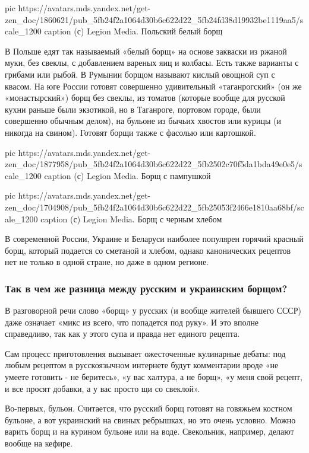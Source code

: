 \ifcmt
pic https://avatars.mds.yandex.net/get-zen_doc/1860621/pub_5fb24f2a1064d30b6c622d22_5fb24fd38d19932be1119aa5/scale_1200
caption (с) Legion Media. Польский белый борщ
\fi

В Польше едят так называемый «белый борщ» на основе закваски из ржаной муки,
без свеклы, с добавлением вареных яиц и колбасы. Есть также варианты с грибами
или рыбой. В Румынии борщом называют кислый овощной суп с квасом. На юге России
готовят совершенно удивительный «таганрогский» (он же «монастырский») борщ без
свеклы, из томатов (которые вообще для русской кухни раньше были экзотикой, но
в Таганроге, портовом городе, были совершенно обычным делом), на бульоне из
бычьих хвостов или курицы (и никогда на свином). Готовят борщи также с фасолью
или картошкой.

\ifcmt
pic https://avatars.mds.yandex.net/get-zen_doc/1877958/pub_5fb24f2a1064d30b6c622d22_5fb2502c70f5da1bda49e0e5/scale_1200
caption (с) Legion Media. Борщ с пампушкой

pic https://avatars.mds.yandex.net/get-zen_doc/1704908/pub_5fb24f2a1064d30b6c622d22_5fb25053f2466e1810aa68bf/scale_1200
caption (с) Legion Media. Борщ с черным хлебом
\fi

В современной России, Украине и Беларуси наиболее популярен горячий красный
борщ, который подается со сметаной и хлебом, однако канонических рецептов нет
не только в одной стране, но даже в одном регионе.

\subsubsection{Так в чем же разница между русским и украинским борщом?}

В разговорной речи слово «борщ» у русских (и вообще жителей бывшего СССР) даже
означает «микс из всего, что попадется под руку». И это вполне справедливо, так
как у этого супа и правда нет единого рецепта.

Сам процесс приготовления вызывает ожесточенные кулинарные дебаты: под любым
рецептом в русскоязычном интернете будут комментарии вроде «не умеете готовить
- не беритесь», «у вас халтура, а не борщ», «у меня свой рецепт, и все просят
добавки, а у вас просто щи со свеклой».

Во-первых, бульон. Считается, что русский борщ готовят на говяжьем костном
бульоне, а вот украинский на свиных ребрышках, но это очень условно. Можно
варить борщ и на курином бульоне или на воде. Свекольник, например, делают
вообще на кефире.

